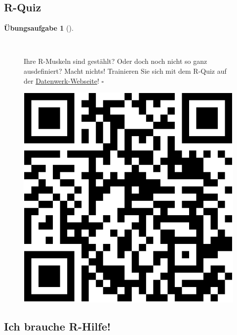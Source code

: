 \documentclass[
  letterpaper,
]{scrbook}
\theoremstyle{definition}
\theoremstyle{definition}
\theoremstyle{definition}
\newtheorem{exercise}{Übungsaufgabe}[chapter]
\theoremstyle{remark}
\begin{document}
\subsection{R-Quiz}\label{r-quiz}

\begin{exercise}[]\protect\hypertarget{exr-rquiz}{}\label{exr-rquiz}

~

\begin{figure}

\begin{minipage}{0.80\linewidth}
Ihre R-Muskeln sind gestählt? Oder doch noch nicht so ganz ausdefiniert?
Macht nichts! Trainieren Sie sich mit dem R-Quiz auf der
\href{https://datenwerk.netlify.app/posts/r-quiz/r-quiz}{Datenwerk-Webseite}!
\(\square\)\end{minipage}%
%
\begin{minipage}{0.20\linewidth}

\begin{center}
\includegraphics[width=0.75\linewidth,height=\textheight,keepaspectratio]{020-R_files/figure-pdf/unnamed-chunk-24-1.pdf}
\end{center}

\end{minipage}%

\end{figure}%

\end{exercise}

\subsection{Ich brauche R-Hilfe!}\label{r-faq}
\end{document}

